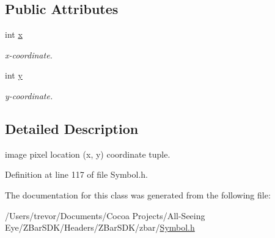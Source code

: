 \subsection*{Public Attributes}
\begin{DoxyCompactItemize}
\item 
\hypertarget{classzbar_1_1_symbol_1_1_point_a742bee232fd98ad427b9da3dc7e583f8}{
int \hyperlink{classzbar_1_1_symbol_1_1_point_a742bee232fd98ad427b9da3dc7e583f8}{x}}
\label{classzbar_1_1_symbol_1_1_point_a742bee232fd98ad427b9da3dc7e583f8}

\begin{DoxyCompactList}\small\item\em x-\/coordinate. \end{DoxyCompactList}\item 
\hypertarget{classzbar_1_1_symbol_1_1_point_a00460abb9489bcd72fefa301806680a2}{
int \hyperlink{classzbar_1_1_symbol_1_1_point_a00460abb9489bcd72fefa301806680a2}{y}}
\label{classzbar_1_1_symbol_1_1_point_a00460abb9489bcd72fefa301806680a2}

\begin{DoxyCompactList}\small\item\em y-\/coordinate. \end{DoxyCompactList}\end{DoxyCompactItemize}


\subsection{Detailed Description}
image pixel location (x, y) coordinate tuple. 

Definition at line 117 of file Symbol.h.



The documentation for this class was generated from the following file:\begin{DoxyCompactItemize}
\item 
/Users/trevor/Documents/Cocoa Projects/All-\/Seeing Eye/ZBarSDK/Headers/ZBarSDK/zbar/\hyperlink{_symbol_8h}{Symbol.h}\end{DoxyCompactItemize}
